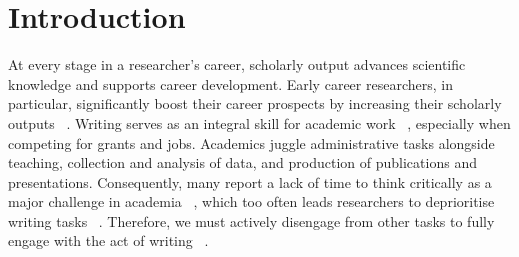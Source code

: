 \documentclass[10pt,letterpaper]{article}
\begin{document}



\linenumbers

\section*{Introduction}

At every stage in a researcher's career, scholarly output advances scientific knowledge and supports career development. Early career researchers, in particular, significantly boost their career prospects by increasing their scholarly outputs ~\cite{horta2016, wilkins2021}. Writing serves as an integral skill for academic work ~\cite{boice1984, hazelett2025}, especially when competing for grants and jobs. Academics juggle administrative tasks alongside teaching, collection and analysis of data, and production of publications and presentations. Consequently, many report a lack of time to think critically as a major challenge in academia ~\cite{menzies2007}, which too often leads researchers to deprioritise writing tasks ~\cite{boice1984, menzies2007}. Therefore, we must actively disengage from other tasks to fully engage with the act of writing ~\cite{murray2009, murray2013}.
\end{document}
